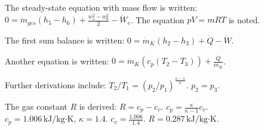 The steady-state equation with mass flow is written:  
\( 0 = \dot{m}_{ges} \left( h_5 - h_6 \right) + \frac{w_5^2 - w_6^2}{2} - \dot{W}_e \).  
The equation \( pV = mRT \) is noted.  

The first sum balance is written:  
\( 0 = \dot{m}_K \left( h_2 - h_3 \right) + \dot{Q} - \dot{W} \).  

Another equation is written:  
\( 0 = \dot{m}_K \left( c_p \left( T_2 - T_3 \right) \right) + \frac{\dot{Q}}{\dot{m}_K} \).  

Further derivations include:  
\( T_2 / T_1 = \left( p_2 / p_1 \right)^{\frac{\kappa - 1}{\kappa}} \).  
\( p_2 = p_3 \).  

The gas constant \( R \) is derived:  
\( R = c_p - c_v \).  
\( c_p = \frac{\kappa}{\kappa - 1} c_v \).  
\( c_p = 1.006 \, \text{kJ/kg·K}, \, \kappa = 1.4 \).  
\( c_v = \frac{1.006}{1.4} \).  
\( R = 0.287 \, \text{kJ/kg·K} \).